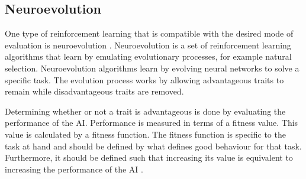 

\subsection{Neuroevolution}
\label{section:neuroevolution}
One type of reinforcement learning that is compatible with the desired mode of evaluation is neuroevolution \cite{gomez:CoSyNE}. Neuroevolution is a set of reinforcement learning algorithms that learn by emulating evolutionary processes, for example natural selection. Neuroevolution algorithms learn by evolving neural networks to solve a specific task. The evolution process works by allowing advantageous traits to remain while disadvantageous traits are removed.  

Determining whether or not a trait is advantageous is done by evaluating the performance of the AI. Performance is measured in terms of a fitness value. This value is calculated by a fitness function. The fitness function is specific to the task at hand and should be defined by what defines good behaviour for that task. Furthermore, it should be defined such that increasing its value is equivalent to increasing the performance of the AI \cite{nelson}.

